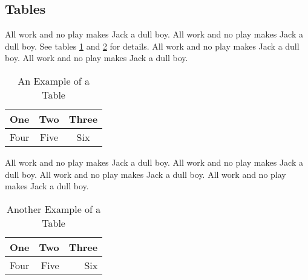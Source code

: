 
%
%

%
%

\subsection{Tables}
\label{sec:discussion_tables}

All work and no play makes Jack a dull boy.
All work and no play makes Jack a dull boy.
See tables
\ref{tab:table_a} and
\ref{tab:table_b} for details.
All work and no play makes Jack a dull boy.
All work and no play makes Jack a dull boy.

\begin{table}[h]
\caption{An Example of a Table}
\label{tab:table_a}
\begin{center}
\begin{tabular}{|c||c|c|}
\hline
One & Two & Three\\
\hline
Four & Five & Six\\
\hline
\end{tabular}
\end{center}
\end{table}

All work and no play makes Jack a dull boy.
All work and no play makes Jack a dull boy.
All work and no play makes Jack a dull boy.
All work and no play makes Jack a dull boy.

\begin{table}[h]
\caption{Another Example of a Table}
\label{tab:table_b}
\begin{center}
\begin{tabular}{lrr}
\hline
One & Two & Three\\
\hline
Four & Five & Six\\
\hline
\end{tabular}
\end{center}
\end{table}
